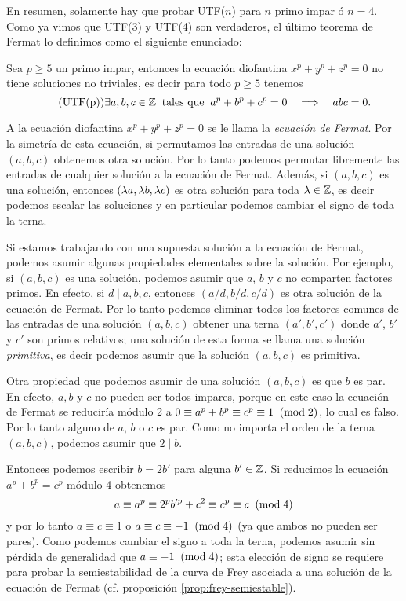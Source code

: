En resumen, solamente hay que probar UTF($n$) para $n$ primo impar ó $n=4$. Como ya vimos que UTF(3) y UTF(4) son verdaderos, el último teorema de Fermat lo definimos como el siguiente enunciado:

\begin{thm}\label{thm:utf}
Sea $p\geq5$ un primo impar, entonces la ecuación diofantina $x^p+y^p+z^p=0$ no tiene soluciones no triviales, es decir para todo $p\geq 5$ tenemos
\begin{equation}\tag{UTF(p)}
	\exists a,b,c\in\mathbb{Z}\;\;\text{tales que}\;\; a^p+b^p+c^p=0 \quad\Longrightarrow\quad abc=0.
\end{equation}
\end{thm}

\begin{nota}
A la ecuación diofantina $x^p+y^p+z^p=0$ se le llama la \emph{ecuación de Fermat}. Por la simetría de esta ecuación, si permutamos las entradas de una solución $(a,b,c)$ obtenemos otra solución. Por lo tanto podemos permutar libremente las entradas de cualquier solución a la ecuación de Fermat. Además, si $(a,b,c)$ es una solución, entonces $(\lambda a,\lambda b,\lambda c)$ es otra solución para toda $\lambda\in\mathbb{Z}$, es decir podemos escalar las soluciones y en particular podemos cambiar el signo de toda la terna.
\end{nota}

Si estamos trabajando con una supuesta solución a la ecuación de Fermat, podemos asumir algunas propiedades elementales sobre la solución.
Por ejemplo, si $(a,b,c)$ es una solución, podemos asumir que $a$, $b$ y $c$ no comparten factores primos. En efecto, si $d\mid a,b,c$, entonces $(a/d,b/d,c/d)$ es otra solución de la ecuación de Fermat. Por lo tanto podemos eliminar todos los factores comunes de las entradas de una solución $(a,b,c)$ obtener una terna $(a',b',c')$ donde $a'$, $b'$ y $c'$ son primos relativos; una solución de esta forma se llama una solución \emph{primitiva}, es decir podemos asumir que la solución $(a,b,c)$ es primitiva.

Otra propiedad que podemos asumir de una solución $(a,b,c)$ es que $b$ es par. En efecto, $a,b$ y $c$ no pueden ser todos impares, porque en este caso la ecuación de Fermat se reduciría módulo 2 a $0\equiv a^p+b^p\equiv c^p\equiv 1\;\;(\mathrm{mod}\; 2)$, lo cual es falso. Por lo tanto alguno de $a$, $b$ o $c$ es par. Como no importa el orden de la terna $(a,b,c)$, podemos asumir que $2\mid b$.

Entonces podemos escribir $b=2b'$ para alguna $b'\in\mathbb{Z}$. Si reducimos la ecuación $a^p+b^p=c^p$ módulo 4 obtenemos
\[
	a\equiv a^p\equiv 2^pb'^p + c^2\equiv c^p\equiv c\;\;(\mathrm{mod}\; 4)
\]
y por lo tanto $a\equiv c\equiv1$ o $a\equiv c\equiv -1\;\;(\mathrm{mod}\; 4)$ (ya que ambos no pueden ser pares). Como podemos cambiar el signo a toda la terna, podemos asumir sin pérdida de generalidad que $a\equiv-1\;\;(\mathrm{mod}\; 4)$; esta elección de signo se requiere para probar la semiestabilidad de la curva de Frey asociada a una solución de la ecuación de Fermat (cf. proposición \ref{prop:frey-semiestable}).

